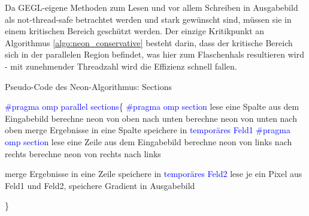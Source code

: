 Da GEGL-eigene Methoden zum Lesen und vor allem Schreiben in Ausgabebild als not-thread-safe betrachtet werden und stark gewünscht sind, müssen sie in einem kritischen Bereich geschützt werden.
Der einzige Kritikpunkt an Algorithmus \ref{algo:neon_conservative} besteht darin, dass der kritische Bereich sich in der parallelen Region befindet, was hier zum Flaschenhals resultieren wird - mit zunehmender Threadzahl wird die Effizienz schnell fallen.





\newpage
\begin{algorithm}[H]
\caption{Pseudo-Code des \glqq Neon\grqq-Algorithmus: Sections}
\label{algo:neon_sections}
\begin{algorithmic}[1]
\State \textcolor{blue}{\#pragma omp parallel sections}\{
\State \textcolor{blue}{\#pragma omp section} 
	\State lese eine Spalte aus dem Eingabebild
		\State berechne neon von oben nach unten
	\EndFor
		\State berechne neon von unten nach oben
	\EndFor
	\State merge Ergebnisse in eine Spalte
	\State speichere in \textcolor{blue}{temporäres Feld1}
\EndFor	
\State \textcolor{blue}{\#pragma omp section}
	\State lese eine Zeile aus dem Eingabebild
		\State berechne neon von links nach rechts
	\EndFor
		\State berechne neon von rechts nach links
	\EndFor	
	
		\State merge Ergebnisse in eine Zeile
	\State speichere in \textcolor{blue}{temporäres Feld2}
\EndFor
{}
	\State \label{neon_keine_datenabhaengigkeit} lese je ein Pixel aus Feld1 und Feld2,  speichere Gradient in Ausgabebild
\EndFor


\State \}
\end{algorithmic}
\end{algorithm}


